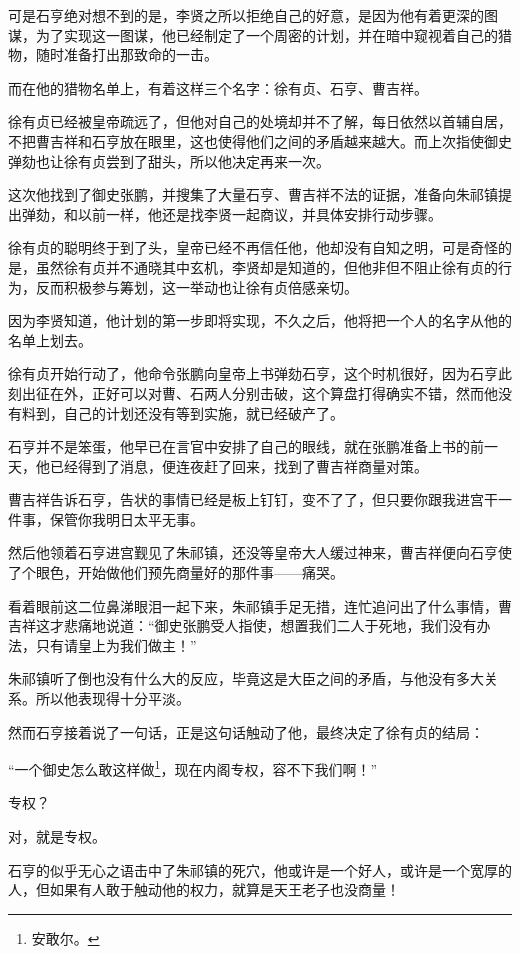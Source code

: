 \begin{multicols}{\theparacolNo}
		可是石亨绝对想不到的是，李贤之所以拒绝自己的好意，是因为他有着更深的图谋，为了实现这一图谋，他已经制定了一个周密的计划，并在暗中窥视着自己的猎物，随时准备打出那致命的一击。

		而在他的猎物名单上，有着这样三个名字：徐有贞、石亨、曹吉祥。

		徐有贞已经被皇帝疏远了，但他对自己的处境却并不了解，每日依然以首辅自居，不把曹吉祥和石亨放在眼里，这也使得他们之间的矛盾越来越大。而上次指使御史弹劾也让徐有贞尝到了甜头，所以他决定再来一次。

		这次他找到了御史张鹏，并搜集了大量石亨、曹吉祥不法的证据，准备向朱祁镇提出弹劾，和以前一样，他还是找李贤一起商议，并具体安排行动步骤。

		徐有贞的聪明终于到了头，皇帝已经不再信任他，他却没有自知之明，可是奇怪的是，虽然徐有贞并不通晓其中玄机，李贤却是知道的，但他非但不阻止徐有贞的行为，反而积极参与筹划，这一举动也让徐有贞倍感亲切。

		因为李贤知道，他计划的第一步即将实现，不久之后，他将把一个人的名字从他的名单上划去。

		徐有贞开始行动了，他命令张鹏向皇帝上书弹劾石亨，这个时机很好，因为石亨此刻出征在外，正好可以对曹、石两人分别击破，这个算盘打得确实不错，然而他没有料到，自己的计划还没有等到实施，就已经破产了。

		石亨并不是笨蛋，他早已在言官中安排了自己的眼线，就在张鹏准备上书的前一天，他已经得到了消息，便连夜赶了回来，找到了曹吉祥商量对策。

		曹吉祥告诉石亨，告状的事情已经是板上钉钉，变不了了，但只要你跟我进宫干一件事，保管你我明日太平无事。

		然后他领着石亨进宫觐见了朱祁镇，还没等皇帝大人缓过神来，曹吉祥便向石亨使了个眼色，开始做他们预先商量好的那件事——痛哭。

		看着眼前这二位鼻涕眼泪一起下来，朱祁镇手足无措，连忙追问出了什么事情，曹吉祥这才悲痛地说道：“御史张鹏受人指使，想置我们二人于死地，我们没有办法，只有请皇上为我们做主！”

		朱祁镇听了倒也没有什么大的反应，毕竟这是大臣之间的矛盾，与他没有多大关系。所以他表现得十分平淡。

		然而石亨接着说了一句话，正是这句话触动了他，最终决定了徐有贞的结局：

		“一个御史怎么敢这样做\footnote{安敢尔。}，现在内阁专权，容不下我们啊！”

		专权？

		对，就是专权。

		石亨的似乎无心之语击中了朱祁镇的死穴，他或许是一个好人，或许是一个宽厚的人，但如果有人敢于触动他的权力，就算是天王老子也没商量！


\end{multicols}

